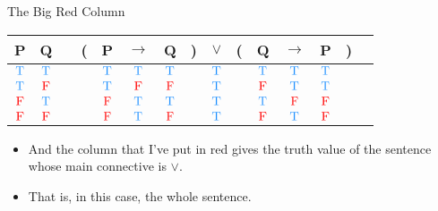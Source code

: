 \documentclass[
  ignorenonframetext,
]{beamer}
\providecommand{\tightlist}{%
  \setlength{\itemsep}{0pt}\setlength{\parskip}{0pt}}
\renewcommand{\,}{\text{, }}
\def\True{\textcolor{dodgerblue}{\text{T}}}
\def\False{\textcolor{red}{\text{F}}}
\begin{document}
\begin{frame}{The Big Red Column}
\protect\hypertarget{the-big-red-column}{}

\begin{center}
\begin{tabular}{@{ }c@{ }@{ }c | c@{ }@{}c@{}@{ }c@{ }@{ }c@{ }@{ }c@{ }@{}c@{}@{ }c@{ }@{}c@{}@{ }c@{ }@{ }c@{ }@{ }c@{ }@{}c@{}@{ }c}
P & Q &  & ( & P & $\rightarrow$ & Q & ) & $\lor$ & ( & Q & $\rightarrow$ & P & ) & \\
\hline 
$\True$ & $\True$ &  &  & $\True$ & $\True$ & $\True$ &  & \textcolor{red}{$\True$} &  & $\True$ & $\True$ & $\True$ &  & \\
$\True$ & $\False$ &  &  & $\True$ & $\False$ & $\False$ &  & \textcolor{red}{$\True$} &  & $\False$ & $\True$ & $\True$ &  & \\
$\False$ & $\True$ &  &  & $\False$ & $\True$ & $\True$ &  & \textcolor{red}{$\True$} &  & $\True$ & $\False$ & $\False$ &  & \\
$\False$ & $\False$ &  &  & $\False$ & $\True$ & $\False$ &  & \textcolor{red}{$\True$} &  & $\False$ & $\True$ & $\False$ &  & \\
\end{tabular}
\bigskip
\end{center}

\begin{itemize}
\tightlist
\item
  And the column that I've put in red gives the truth value of the
  sentence whose main connective is \(\vee\).
\item
  That is, in this case, the whole sentence.
\end{itemize}

\end{frame}
\end{document}
